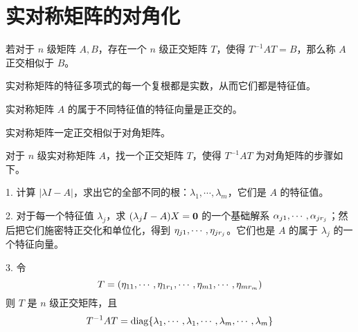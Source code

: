 \section{实对称矩阵的对角化}

若对于 $n$ 级矩阵 $A,B$，存在一个 $n$ 级正交矩阵 $T$，使得 $T^{-1}AT=B$，那么称 $A$ 正交相似于 $B$。

\begin{theorem}
    实对称矩阵的特征多项式的每一个复根都是实数，从而它们都是特征值。
\end{theorem}

\begin{theorem}
    实对称矩阵 $A$ 的属于不同特征值的特征向量是正交的。
\end{theorem}

\begin{theorem}
    实对称矩阵一定正交相似于对角矩阵。
\end{theorem}

对于 $n$ 级实对称矩阵 $A$，找一个正交矩阵 $T$，使得 $T^{-1}AT$ 为对角矩阵的步骤如下。

1. 计算 $|\lambda I- A|$，求出它的全部不同的根：$\lambda_1,\cdots,\lambda_m$，它们是 $A$ 的特征值。

2. 对于每一个特征值 $\lambda_j$，求 $(\lambda_jI-A)X = \boldsymbol{0}$ 的一个基础解系 $\alpha_{j1},\cdots,\alpha_{jr_j}$；然后把它们施密特正交化和单位化，得到 $\eta_{j1},\cdots,\eta_{jr_j}$。它们也是 $A$ 的属于 $\lambda_j$ 的一个特征向量。

3. 令
\[T=(\eta_{11},\cdots,\eta_{1r_1},\cdots,\eta_{m1},\cdots,\eta_{mr_m})\]
则 $T$ 是 $n$ 级正交矩阵，且
\[T^{-1}AT = \operatorname{diag}\{\lambda_{1},\cdots,\lambda_{1},\cdots,\lambda_{m},\cdots,\lambda_{m}\}\]
